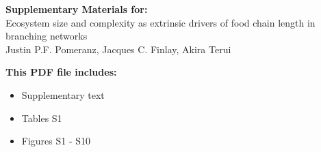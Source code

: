 \begin{center}
\LARGE{\textbf{Supplementary Materials for:}}\\[7.5mm]
\LARGE{Ecosystem size and complexity as extrinsic drivers of food chain length in branching networks}\\[7.5mm]
\large{Justin P.F. Pomeranz, Jacques C. Finlay, Akira Terui}\\[7.5mm]
\end{center}
\begin{flushleft}
\textbf{This PDF file includes:}
\begin{itemize}
\item Supplementary text
\item Tables S1
\item Figures S1 - S10
\end{itemize}
\end{flushleft}

\newpage